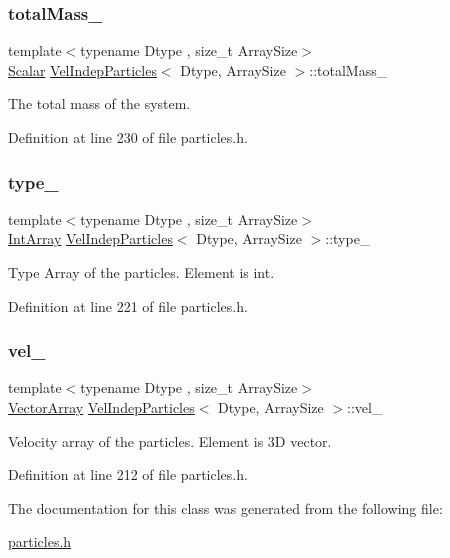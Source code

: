 \subsubsection{\texorpdfstring{total\+Mass\+\_\+}{totalMass\_}}
{\footnotesize\ttfamily template$<$typename Dtype , size\+\_\+t Array\+Size$>$ \\
\mbox{\hyperlink{class_vel_indep_particles_a5d275b22f0d759f360ddd80e78f4b466}{Scalar}} \mbox{\hyperlink{class_vel_indep_particles}{Vel\+Indep\+Particles}}$<$ Dtype, Array\+Size $>$\+::total\+Mass\+\_\+\hspace{0.3cm}{\ttfamily [protected]}}



The total mass of the system. 



Definition at line 230 of file particles.\+h.

\mbox{\label{class_vel_indep_particles_a97dbd52da7443243bf74de22bb8cde96}} 
\subsubsection{\texorpdfstring{type\+\_\+}{type\_}}
{\footnotesize\ttfamily template$<$typename Dtype , size\+\_\+t Array\+Size$>$ \\
\mbox{\hyperlink{class_vel_indep_particles_a5e4f20d435c71a5f4179143206258a81}{Int\+Array}} \mbox{\hyperlink{class_vel_indep_particles}{Vel\+Indep\+Particles}}$<$ Dtype, Array\+Size $>$\+::type\+\_\+\hspace{0.3cm}{\ttfamily [protected]}}



Type Array of the particles. Element is int. 



Definition at line 221 of file particles.\+h.

\mbox{\label{class_vel_indep_particles_a48906984e10585a234f763885ce728a6}} 
\subsubsection{\texorpdfstring{vel\+\_\+}{vel\_}}
{\footnotesize\ttfamily template$<$typename Dtype , size\+\_\+t Array\+Size$>$ \\
\mbox{\hyperlink{class_vel_indep_particles_a27580f65b6523bfb6900520af2e44708}{Vector\+Array}} \mbox{\hyperlink{class_vel_indep_particles}{Vel\+Indep\+Particles}}$<$ Dtype, Array\+Size $>$\+::vel\+\_\+\hspace{0.3cm}{\ttfamily [protected]}}



Velocity array of the particles. Element is 3D vector. 



Definition at line 212 of file particles.\+h.



The documentation for this class was generated from the following file\+:\begin{DoxyCompactItemize}
\item 
\mbox{\hyperlink{particles_8h}{particles.\+h}}\end{DoxyCompactItemize}
